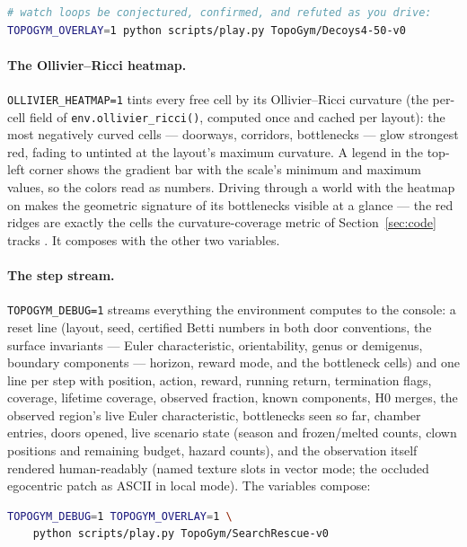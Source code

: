 \documentclass[11pt]{article}
\begin{document}
\begin{lstlisting}[language=bash]
# watch loops be conjectured, confirmed, and refuted as you drive:
TOPOGYM_OVERLAY=1 python scripts/play.py TopoGym/Decoys4-50-v0
\end{lstlisting}

\paragraph{The Ollivier--Ricci heatmap.}
\texttt{OLLIVIER\_HEATMAP=1} tints every free cell by its
Ollivier--Ricci curvature (the per-cell field of
\texttt{env.ollivier\_ricci()}, computed once and cached per
layout): the most negatively curved cells --- doorways, corridors,
bottlenecks --- glow strongest red, fading to untinted at the
layout's maximum curvature. A legend in the top-left corner shows the
gradient bar with the scale's minimum and maximum values, so the
colors read as numbers. Driving through a world with the heatmap on
makes the geometric signature of its bottlenecks visible at a glance
--- the red ridges are exactly the cells the curvature-coverage
metric of Section~\ref{sec:code} tracks \cite{ollivier09}. It
composes with the other two variables.

\paragraph{The step stream.} \texttt{TOPOGYM\_DEBUG=1} streams
everything the environment computes to the console: a reset line
(layout, seed, certified Betti numbers in both door conventions, the
surface invariants --- Euler characteristic, orientability, genus or
demigenus, boundary components --- horizon, reward mode, and the
bottleneck cells) and one line per step with position, action,
reward, running return, termination flags, coverage, lifetime
coverage, observed fraction, known components, H0 merges, the
observed region's live Euler characteristic, bottlenecks seen so far,
chamber entries, doors opened, live scenario state (season and
frozen/melted counts, clown positions and remaining budget, hazard
counts), and the observation itself rendered human-readably (named
texture slots in vector mode; the occluded egocentric patch as ASCII
in local mode). The variables compose:

\begin{lstlisting}[language=bash]
TOPOGYM_DEBUG=1 TOPOGYM_OVERLAY=1 \
    python scripts/play.py TopoGym/SearchRescue-v0
\end{lstlisting}
\end{document}
